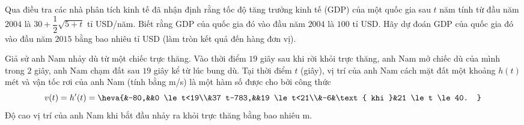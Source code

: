 \begin{bt}%
	Qua điều tra các nhà phân tích kinh tế đã nhận định rằng tốc độ tăng trưởng kinh tế (GDP) của một quốc gia sau $t$ năm tính từ đầu năm $2004$ là $30 + \dfrac{1}{2}\sqrt{5+t}$ tỉ USD/năm. Biết rằng  GDP của quốc gia đó vào đầu năm $2004$ là $100$ tỉ USD. Hãy dự đoán GDP của quốc gia đó vào đầu năm $2015$ bằng bao nhiêu tỉ USD (làm tròn kết quả đến hàng đơn vị).
\end{bt}

\begin{bt}%
	Giả sử anh Nam nhảy dù từ một chiếc trực thăng. Vào thời điểm $19$ giây sau khi rời khỏi trực thăng, anh Nam mở chiếc dù của mình trong $2$ giây, anh Nam chạm đất sau $19$ giây kể từ lúc  bung dù. Tại thời điểm $t$ (giây), vị trí của anh Nam cách mặt đất một khoảng $h(t)$ mét và vận tốc rơi của anh Nam (tính bằng m/s) là một hàm số được cho bởi công thức
	\[v(t)=h'(t)=\heva{&-80,&&0 \le t<19\\&37 t-783,&&19 \le t<21\\&-6&\text{ khi }&21 \le t \le 40.  }\]
	Độ cao vị trí của anh Nam khi bắt đầu nhảy ra khỏi trực thăng bằng bao  nhiêu m.
\end{bt}

